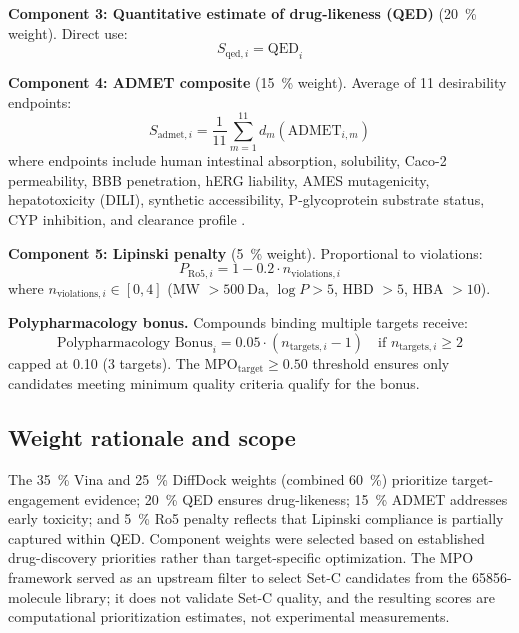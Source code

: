 \documentclass[journal=jcisd8,manuscript=suppinfo]{achemso}
\begin{document}
\textbf{Component 3: Quantitative estimate of drug-likeness (QED)} (\qty{20}{\percent} weight). Direct use:
\begin{equation}
S_{\text{qed}, i} = \text{QED}_i
\label{eq:sm_qed}
\end{equation}

\textbf{Component 4: ADMET composite} (\qty{15}{\percent} weight). Average of 11 desirability endpoints:
\begin{equation}
S_{\text{admet}, i} = \frac{1}{11} \sum_{m=1}^{11} d_m(\text{ADMET}_{i,m})
\label{eq:sm_admet}
\end{equation}
where endpoints include human intestinal absorption, solubility, Caco-2 permeability, BBB penetration, hERG liability, AMES mutagenicity, hepatotoxicity (DILI), synthetic accessibility, P-glycoprotein substrate status, CYP inhibition, and clearance profile \cite{Swanson2024}.

\textbf{Component 5: Lipinski penalty} (\qty{5}{\percent} weight). Proportional to violations:
\begin{equation}
P_{\text{Ro5}, i} = 1 - 0.2 \cdot n_{\text{violations}, i}
\label{eq:sm_ro5}
\end{equation}
where $n_{\text{violations}, i} \in [0,4]$ (MW $> \qty{500}{\dalton}$, $\log P > \num{5}$, HBD $> \num{5}$, HBA $> \num{10}$).

\textbf{Polypharmacology bonus.} Compounds binding multiple targets receive:
\begin{equation}
\text{Polypharmacology Bonus}_i = 0.05 \cdot (n_{\text{targets}, i} - 1) \quad \text{if } n_{\text{targets}, i} \geq 2
\label{eq:sm_poly}
\end{equation}
capped at \num{+0.10} (3 targets). The $\text{MPO}_{\text{target}} \geq \num{0.50}$ threshold ensures only candidates meeting minimum quality criteria qualify for the bonus.

\subsection{Weight rationale and scope}\label{sec:sm_mpo_weights}
The \qty{35}{\percent} Vina and \qty{25}{\percent} DiffDock weights (combined \qty{60}{\percent}) prioritize target-engagement evidence; \qty{20}{\percent} QED ensures drug-likeness; \qty{15}{\percent} ADMET addresses early toxicity; and \qty{5}{\percent} Ro5 penalty reflects that Lipinski compliance is partially captured within QED. Component weights were selected based on established drug-discovery priorities \cite{Hughes2008,Gleeson2008,Lipinski2004} rather than target-specific optimization. The MPO framework served as an upstream filter to select Set-C candidates from the \num{65856}-molecule library; it does not validate Set-C quality, and the resulting scores are computational prioritization estimates, not experimental measurements.
\end{document}
